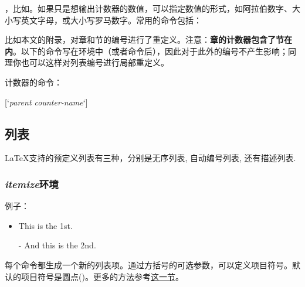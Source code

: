 ，比如。如果只是想输出计数器的数值，可以指定数值的形式，如阿拉伯数字、大小写英文字母，或大小写罗马数字。常用的命令包括：
\begin{latex}
\Alph \alph \Roman \roman
\end{latex}

比如本文的附录，对章和节的编号进行了重定义。注意：\textbf{章的计数器包含了节在内}。以下的命令写在环境中（或者命令后），因此对于此外的编号不产生影响；同理你也可以这样对列表编号进行局部重定义。
\begin{latex}
\renewcommand{\thechapter}{\Alph{chapter}}
\renewcommand{\thesection}
    {\thechapter-\arabic{section}}
\renewcommand{\thefootnote}{[\arabic{footnote}]}
\end{latex}

计数器的命令：
\begin{latex}
[`\textit{parent counter-name}`]
\end{latex}

\subsection{列表}
\LaTeX 支持的预定义列表有三种，分别是无序列表, 自动编号列表, 还有描述列表.

\subsubsection{\textit{itemize}环境}
例子：

\begin{codeshow}
\begin{itemize}
  \item This is the 1st.
  \item[-] And this is the 2nd.
\end{itemize}
\end{codeshow}

每个命令都生成一个新的列表项。通过方括号的可选参数，可以定义项目符号。默认的项目符号是圆点()。更多的方法参考\hyperref[sec:list]{这一节}。

